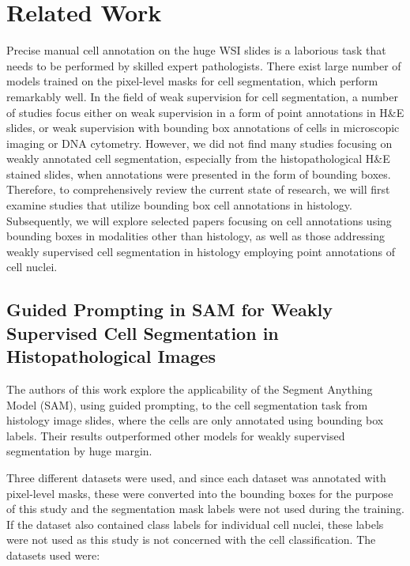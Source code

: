 \chapter{Related Work}
Precise manual cell annotation on the huge WSI slides is a laborious task that needs to be performed by skilled expert pathologists. There exist large number of models trained on the pixel-level masks for cell segmentation, which perform remarkably well. In the field of weak supervision for cell segmentation, a number of studies focus either on weak supervision in a form of point annotations in H\&E slides, or weak supervision with bounding box annotations of cells in microscopic imaging or DNA cytometry. However, we did not find many studies focusing on weakly annotated cell segmentation, especially from the histopathological H\&E stained slides, when annotations were presented in the form of bounding boxes. Therefore, to comprehensively review the current state of research, we will first examine studies that utilize bounding box cell annotations in histology. Subsequently, we will explore selected papers focusing on cell annotations using bounding boxes in modalities other than histology, as well as those addressing weakly supervised cell segmentation in histology employing point annotations of cell nuclei.


\section{Guided Prompting in SAM for Weakly Supervised Cell Segmentation in Histopathological Images \cite{Tyagi2023}}
The authors of this work explore the applicability of the Segment Anything Model (SAM), using guided prompting, to the cell segmentation task from histology image slides, where the cells are only annotated using bounding box labels. Their results outperformed other models for weakly supervised segmentation by huge margin.

Three different datasets were used, and since each dataset was annotated with pixel-level masks, these were converted into the bounding boxes for the purpose of this study and the segmentation mask labels were not used during the training. If the dataset also contained class labels for individual cell nuclei, these labels were not used as this study is not concerned with the cell classification. The datasets used were: 

